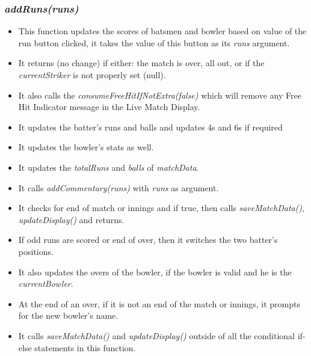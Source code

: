 \documentclass[a4paper,12pt]{article}
\begin{document}
\subsubsection{\textit{addRuns(runs)}}
\begin{itemize}
\item This function updates the scores of batsmen and bowler based on value of the run button clicked, it takes the value of this button as its \textit{runs} argument.
\item It returns (no change) if either: the match is over, all out, or if the \textit{currentStriker} is not properly set (null).
\item It also calls the \textit{consumeFreeHitIfNotExtra(false)} which will remove any Free Hit Indicator message in the Live Match Display.
\item It updates the batter's runs and balls and updates 4s and 6s if required
\item It updates the bowler's stats as well.
\item It updates the \textit{totalRuns} and \textit{balls} of \textit{matchData}.
\item It calls \textit{addCommentary(runs)} with \textit{runs} as argument.
\item It checks for end of match or innings and if true, then calls \textit{saveMatchData()}, \textit{updateDisplay()} and returns.
\item If odd runs are scored or end of over, then it switches the two batter's positions.
\item It also updates the overs of the bowler, if the bowler is valid and he is the \textit{currentBowler}.
\item At the end of an over, if it is not an end of the match or innings, it prompts for the new bowler's name.
\item It calls \textit{saveMatchData()} and \textit{updateDisplay()} outside of all the conditional if-else statements in this function. 
\end{itemize}
\end{document}
